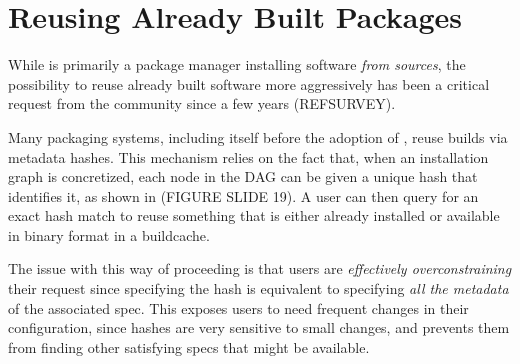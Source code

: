 \section{Reusing Already Built Packages}
\label{sec:reuse}

While \spack{} is primarily a package manager installing software \emph{from sources}, the possibility to reuse  already built software more aggressively has been a critical request from the community since a few years (REFSURVEY).

Many packaging systems, including \spack{} itself before the adoption of \clingo, reuse builds via metadata hashes. This mechanism relies on the fact that, when an installation graph is concretized, each node in the DAG can be given a unique hash that identifies it, as shown in (FIGURE SLIDE 19). A user can then query for an exact hash match to reuse something that is either already installed or available in binary format in a buildcache. 

The issue with this way of proceeding is that users are \emph{effectively overconstraining} their request since specifying the hash is equivalent to specifying \emph{all the metadata} of the associated spec. This exposes users to need frequent changes in their configuration, since hashes are very sensitive to small changes, and prevents them from finding other satisfying specs that might be available.

